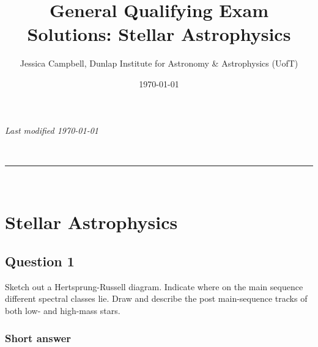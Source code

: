 \documentclass[a4paper,10pt]{article}
\makeatletter
\newcommand{\linia}{\rule{\linewidth}{0.5pt}}
\renewcommand{\maketitle}{
\begin{center}
\vspace{2ex}
{\huge \textsc{\@title}}
\vspace{1ex}
\\
\linia\\
\@author
\vspace{4ex}
\end{center}
}
\makeatother
\begin{document}
\hfill{\textit{Last modified \today}}
\title{General Qualifying Exam Solutions: Stellar Astrophysics}
\author{Jessica Campbell, Dunlap Institute for Astronomy \& Astrophysics (UofT)}
\date{\today}
\maketitle

\tableofcontents



%
%
%
%

\newpage
\section{Stellar Astrophysics}


\subsection{Question 1}

Sketch out a Hertsprung-Russell diagram. Indicate where on the main sequence different spectral classes lie. Draw and describe the post main-sequence tracks of both low- and high-mass stars.

\subsubsection{Short answer}
\end{document}
